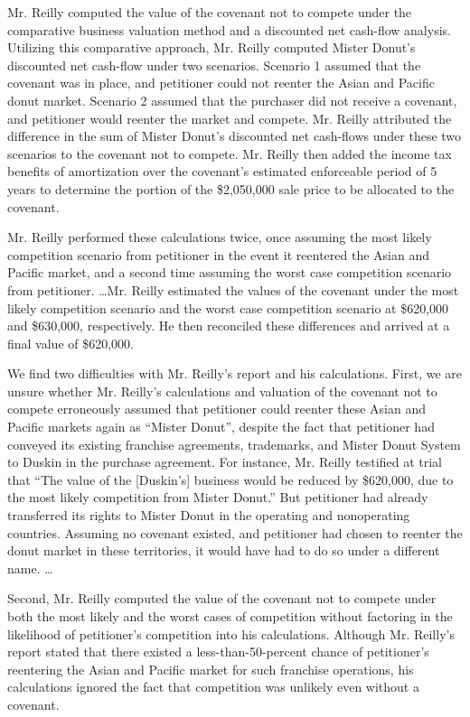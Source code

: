 \begin{select}
Mr. Reilly computed the value of the covenant not to compete under the comparative business valuation method and a
discounted net cash-flow analysis. Utilizing this comparative approach, Mr. Reilly computed Mister Donut's discounted
net cash-flow under two scenarios. Scenario 1 assumed that the covenant was in place, and petitioner could
not reenter the Asian and Pacific donut market. Scenario 2 assumed that the purchaser did not receive a covenant, and
petitioner would reenter the market and compete. Mr. Reilly attributed the difference in the sum of Mister Donut's
discounted net cash-flows under these two scenarios to the covenant not to compete. Mr. Reilly then added the income
tax benefits of amortization over the covenant's estimated enforceable period of 5 years to determine the portion of the
\$2,050,000 sale price to be allocated to the covenant.

Mr. Reilly performed these calculations twice, once assuming the most likely competition scenario from petitioner in
the event it reentered the Asian and Pacific market, and a second time assuming the worst case competition scenario from
petitioner. \ldots  Mr. Reilly estimated the values of the covenant under the most likely competition scenario and the worst
case competition scenario at \$620,000 and \$630,000, respectively. He then reconciled these differences and arrived at a
final value of \$620,000.

We find two difficulties with Mr. Reilly's report and his calculations. First, we are unsure whether Mr. Reilly's
calculations and valuation of the covenant not to compete erroneously assumed that petitioner could reenter these
Asian and Pacific markets again as ``Mister Donut'', despite the fact that petitioner had conveyed its existing franchise
agreements, trademarks, and Mister Donut System to Duskin in the purchase agreement. For instance, Mr. Reilly testified
at trial that ``The value of the [Duskin's] business would be reduced by \$620,000, due to the most likely competition from
Mister Donut.'' But petitioner had already transferred its rights to Mister Donut in the operating and nonoperating countries. Assuming no covenant existed, and petitioner had chosen to reenter the donut market in these territories, it would have had to do so under a different name. \ldots

Second, Mr. Reilly computed the value of the covenant not to compete under both the most likely and the worst cases
of competition without factoring in the likelihood of petitioner's competition into his calculations. Although Mr. Reilly's
report stated that there existed a less-than-50-percent chance of petitioner's reentering the Asian and Pacific market for
such franchise operations, his calculations ignored the fact that competition was unlikely even without a covenant.


\end{select}

